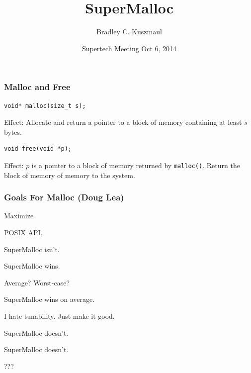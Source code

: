 \documentclass[xcolor=dvipsnames,14pt]{beamer}
\begin{document}
\title{SuperMalloc}
\author{Bradley C. Kuszmaul}
\date{Supertech Meeting Oct 6, 2014}
\frame{\titlepage}

\begin{frame}[fragile]
\frametitle{Malloc and Free}
\begin{verbatim}
void* malloc(size_t s);
\end{verbatim}

Effect: Allocate and return a pointer to a block of memory containing at least $s$ bytes.

\begin{verbatim}
void free(void *p);
\end{verbatim}

Effect: $p$ is a pointer to a block of memory returned by \texttt{malloc()}.  Return the block of memory of memory to the system.
\end{frame}


\begin{frame}
\frametitle{Goals For Malloc (Doug Lea)}

Maximize
\begin{description}
\item[Compatibility:] POSIX API.

\item[Portability:] SuperMalloc isn't.
\item[Space:] SuperMalloc wins.
\item[Time:] Average? Worst-case?  

SuperMalloc wins on average.
\item[Tunability:]

I hate tunability. Just make it good.
\item[Locality:] SuperMalloc doesn't.
\item[Error Detection:] SuperMalloc doesn't.
\item[Anomalies:] ???
\end{description}
\end{frame}
\end{document}
